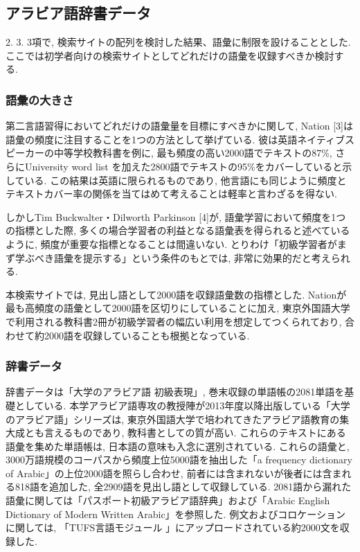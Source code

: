 \documentclass[technicalreport]{ieicej}
\begin{document}
\subsection{アラビア語辞書データ}
2. 3. 3項で, 検索サイトの配列を検討した結果、語彙に制限を設けることとした. ここでは初学者向けの検索サイトとしてどれだけの語彙を収録すべきか検討する.

\subsubsection{語彙の大きさ}
第二言語習得においてどれだけの語彙量を目標にすべきかに関して, Nation [3]は語彙の頻度に注目することを1つの方法として挙げている. 彼は英語ネイティブスピーカーの中等学校教科書を例に, 最も頻度の高い2000語でテキストの87\%, さらにUniversity word list を加えた2800語でテキストの95\%をカバーしていると示している. この結果は英語に限られるものであり, 他言語にも同じように頻度とテキストカバー率の関係を当てはめて考えることは軽率と言わざるを得ない. 

しかしTim Buckwalter・Dilworth Parkinson [4]が, 語彙学習において頻度を1つの指標とした際, 多くの場合学習者の利益となる語彙表を得られると述べているように, 頻度が重要な指標となることは間違いない. とりわけ「初級学習者がまず学ぶべき語彙を提示する」という条件のもとでは, 非常に効果的だと考えられる.

本検索サイトでは, 見出し語として2000語を収録語彙数の指標とした. Nationが最も高頻度の語彙として2000語を区切りにしていることに加え, 東京外国語大学で利用される教科書2冊が初級学習者の幅広い利用を想定してつくられており, 合わせて約2000語を収録していることも根拠となっている.

\subsubsection{辞書データ}
辞書データは「大学のアラビア語 初級表現」, 巻末収録の単語帳の2081単語を基礎としている. 本学アラビア語専攻の教授陣が2013年度以降出版している「大学のアラビア語」シリーズは, 東京外国語大学で培われてきたアラビア語教育の集大成とも言えるものであり, 教科書としての質が高い. これらのテキストにある語彙を集めた単語帳は, 日本語の意味も入念に選別されている. これらの語彙と, 3000万語規模のコーパスから頻度上位5000語を抽出した「a frequency dictionary of Arabic」の上位2000語を照らし合わせ, 前者には含まれないが後者には含まれる818語を追加した, 全2909語を見出し語として収録している. 2081語から漏れた語彙に関しては「パスポート初級アラビア語辞典」および「Arabic English Dictionary of Modern Written Arabic」を参照した. 例文およびコロケーションに関しては, 「TUFS言語モジュール 」にアップロードされている約2000文を収録した.
\end{document}

